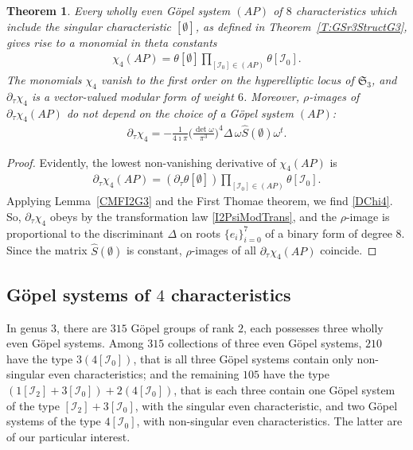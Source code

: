\documentclass[twoside]{amsart}
\newcommand{\I}{\mathcal{I}}
\newtheorem{theo}{Theorem}[section]
\theoremstyle{definition}
\theoremstyle{plain}
\begin{document}
\begin{theo}\label{T:Chi4G3}
Every wholly even G\"{o}pel system $(AP)$ of $8$ characteristics 
which include the singular characteristic $[\emptyset]$, 
as defined in Theorem~\ref{T:GSr3StructG3},
gives rise to a monomial in theta constants 
\begin{gather}\label{Chi4G3}
\chi_4 (AP) = \theta[\emptyset] \prod_{[\I_0] \in (AP)} \theta[\I_0]. 
\end{gather}
The monomials $\chi_4$ vanish to the first order on the hyperelliptic locus of $\mathfrak{S}_3$, 
and $\partial_\tau \chi_4$ is a vector-valued modular form of weight $6$. Moreover,  $\rho$-images
of $\partial_\tau \chi_4 (AP)$ do not depend on the choice of a G\"{o}pel system $(AP)$:
\begin{gather}\label{DChi4}
\partial_\tau \chi_4  =  - \frac{1}{4\imath \pi} 
\Big(\frac{\det \omega}{\pi^3}\Big)^{4} \Delta \, \omega \hat{S}(\emptyset) \omega^t.
\end{gather}
\end{theo}
\begin{proof}
Evidently, the lowest non-vanishing derivative of $\chi_4(AP)$ is
\begin{gather*}
\partial_\tau \chi_4 (AP) = (\partial_\tau \theta[\emptyset]) \prod_{[\I_0] \in (AP)} \theta[\I_0].
\end{gather*}
Applying Lemma~\ref{CMFI2G3} and the First  Thomae theorem, we find \eqref{DChi4}.
So, $\partial_\tau \chi_4$ obeys by the transformation law \eqref{I2PsiModTrans}, and 
the $\rho$-image is proportional to the discriminant $\Delta$ 
on roots $\{e_i\}_{i=0}^7$ of a binary form of degree $8$.
Since the matrix $\hat{S}(\emptyset)$ is constant,  $\rho$-images of all $\partial_\tau \chi_4 (AP)$
coincide.
\end{proof}


\subsection{G\"{o}pel systems of $4$ characteristics}
In genus $3$, there are 
$315$ G\"{o}pel groups of rank $2$, each possesses three wholly even G\"{o}pel systems.
Among $315$ collections of three even G\"{o}pel systems, $210$ have
the type $3(4[\I_0])$, that is all three G\"{o}pel systems contain only non-singular even characteristics;
and the remaining $105$ have the type  $(1[\I_2]+3[\I_0])+2(4[\I_0])$, that is each three
contain one G\"{o}pel system of the type $[\I_2]+3[\I_0]$, with the singular even characteristic, 
and two G\"{o}pel systems of the type $4[\I_0]$, with non-singular even characteristics. 
The latter are of our particular interest.
\end{document}
